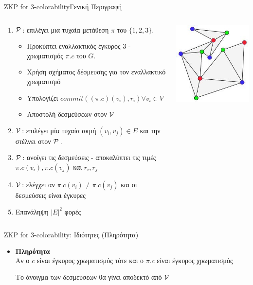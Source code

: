 \documentclass[10pt,handout]{beamer}
\begin{document}
\begin{frame}{ZKP for 3-colorability}{Γενική Περιγραφή}
\begin{columns}
\begin{small}
\begin{enumerate}
 	\setlength \itemsep{0.1em}
	\item $\mathcal{P}\,$: επιλέγει μια τυχαία μετάθεση $\pi$ του $\{ 1,2,3 \}$. \pause
	\begin{itemize}
		\item Προκύπτει εναλλακτικός έγκυρος 3 - χρωματισμός $\pi.c$ του $G$. \pause
		\item Χρήση σχήματος δέσμευσης για τον εναλλακτικό χρωματισμό
		\item Yπολογίζει $commit( (\pi.c)(v_i), r_i) \forall v_i \in V$ 
		\item Αποστολή δεσμεύσεων στον $\mathcal{V}\,$ \pause
	\end{itemize}
	\item $\mathcal{V}\,$: επιλέγει μία τυχαία ακμή $(v_i, v_j) \in E$ και την στέλνει στον $\mathcal{P}\,$. \pause
	\item $\mathcal{P}\,$: ανοίγει τις δεσμεύσεις - αποκαλύπτει τις τιμές $\pi.c(v_i),\pi.c(v_j)$ και $r_i, r_j$ \pause
	\item $\mathcal{V}\,$: ελέγχει αν $\pi.c(v_i) \neq \pi.c(v_j)$ και οι δεσμεύσεις είναι έγκυρες
	\item Επανάληψη $|E|^2$ φορές
\end{enumerate}
\end{small}
\begin{center}
\includegraphics[scale=0.6]{3cp2.jpg}
\end{center}
\end{columns}
\end{frame}

 
\begin{frame}{ZKP for 3-colorability: Ιδιότητες (Πληρότητα)} 
\begin{itemize}
\item \textbf{Πληρότητα}\\
Αν ο $c$ είναι έγκυρος χρωματισμός τότε και ο $\pi.c$ είναι έγκυρος χρωματισμός

Το άνοιγμα των δεσμεύσεων θα γίνει αποδεκτό από $\mathcal{V}\,$
\end{itemize}
\end{frame}
\end{document}
